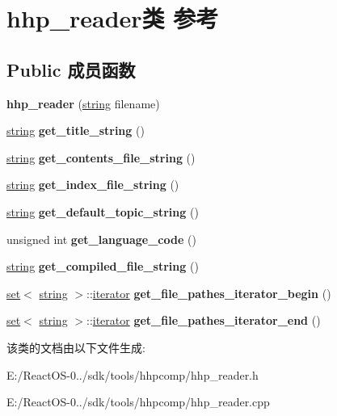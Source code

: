 \hypertarget{classhhp__reader}{}\section{hhp\+\_\+reader类 参考}
\label{classhhp__reader}
\subsection*{Public 成员函数}
\begin{DoxyCompactItemize}
\item 
\mbox{\label{classhhp__reader_aa851a06944afce0258baaa70596bb0af}} 
{\bfseries hhp\+\_\+reader} (\hyperlink{structstring}{string} filename)
\item 
\mbox{\label{classhhp__reader_ac82cfb4b2b0991ee1bca8283df5399d9}} 
\hyperlink{structstring}{string} {\bfseries get\+\_\+title\+\_\+string} ()
\item 
\mbox{\label{classhhp__reader_a22bbf6417a84a761b2a33e4f8185b40b}} 
\hyperlink{structstring}{string} {\bfseries get\+\_\+contents\+\_\+file\+\_\+string} ()
\item 
\mbox{\label{classhhp__reader_aba10dade7641bfaaaf27092be3c5bcea}} 
\hyperlink{structstring}{string} {\bfseries get\+\_\+index\+\_\+file\+\_\+string} ()
\item 
\mbox{\label{classhhp__reader_a24fabefed95c2a9eb8f66e2f59e17f00}} 
\hyperlink{structstring}{string} {\bfseries get\+\_\+default\+\_\+topic\+\_\+string} ()
\item 
\mbox{\label{classhhp__reader_afbbee3873a07edc26fc6d567c5bd382e}} 
unsigned int {\bfseries get\+\_\+language\+\_\+code} ()
\item 
\mbox{\label{classhhp__reader_a8f60f6a10f600f8beb7db9fd184bfec9}} 
\hyperlink{structstring}{string} {\bfseries get\+\_\+compiled\+\_\+file\+\_\+string} ()
\item 
\mbox{\label{classhhp__reader_aa5a28b829f63ef9befab069783af7389}} 
\hyperlink{classset}{set}$<$ \hyperlink{structstring}{string} $>$\+::\hyperlink{structiterator}{iterator} {\bfseries get\+\_\+file\+\_\+pathes\+\_\+iterator\+\_\+begin} ()
\item 
\mbox{\label{classhhp__reader_aa2da9ee67e4bcb4d2a85fc8a2a5b4167}} 
\hyperlink{classset}{set}$<$ \hyperlink{structstring}{string} $>$\+::\hyperlink{structiterator}{iterator} {\bfseries get\+\_\+file\+\_\+pathes\+\_\+iterator\+\_\+end} ()
\end{DoxyCompactItemize}


该类的文档由以下文件生成\+:\begin{DoxyCompactItemize}
\item 
E\+:/\+React\+O\+S-\/0../sdk/tools/hhpcomp/hhp\+\_\+reader.\+h\item 
E\+:/\+React\+O\+S-\/0../sdk/tools/hhpcomp/hhp\+\_\+reader.\+cpp\end{DoxyCompactItemize}

